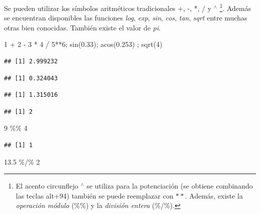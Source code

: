 \documentclass[
]{book}
\newenvironment{Shaded}{\begin{snugshade}}{\end{snugshade}}
\newcommand{\DecValTok}[1]{\textcolor[rgb]{0.00,0.00,0.81}{#1}}
\newcommand{\FloatTok}[1]{\textcolor[rgb]{0.00,0.00,0.81}{#1}}
\newcommand{\FunctionTok}[1]{\textcolor[rgb]{0.00,0.00,0.00}{#1}}
\newcommand{\NormalTok}[1]{#1}
\newcommand{\SpecialCharTok}[1]{\textcolor[rgb]{0.00,0.00,0.00}{#1}}
\begin{document}
Se pueden utilizar los símbolos aritméticos tradicionales +, -, *, / y \(^\wedge\) \footnote{El acento circunflejo \(^\wedge\) se utiliza para la potenciación (se obtiene combinando las teclas alt+94) también se puede reemplazar con \(**\). Además, existe la \emph{operación módulo} (\%\%) y la \emph{división entera} (\%/\%).}. Además se encuentran disponibles las funciones \emph{log}, \emph{exp}, \emph{sin}, \emph{cos}, \emph{tan}, \emph{sqrt} entre muchas otras bien conocidas. También existe el valor de \emph{pi}.

\begin{Shaded}
\begin{Highlighting}[]
\DecValTok{1} \SpecialCharTok{+} \DecValTok{2} \SpecialCharTok{{-}} \DecValTok{3} \SpecialCharTok{*} \DecValTok{4} \SpecialCharTok{/} \DecValTok{5}\SpecialCharTok{**}\DecValTok{6}\NormalTok{; }\FunctionTok{sin}\NormalTok{(}\FloatTok{0.33}\NormalTok{); }\FunctionTok{acos}\NormalTok{(}\FloatTok{0.253}\NormalTok{) ; }\FunctionTok{sqrt}\NormalTok{(}\DecValTok{4}\NormalTok{)}
\end{Highlighting}
\end{Shaded}

\begin{verbatim}
## [1] 2.999232
\end{verbatim}

\begin{verbatim}
## [1] 0.324043
\end{verbatim}

\begin{verbatim}
## [1] 1.315016
\end{verbatim}

\begin{verbatim}
## [1] 2
\end{verbatim}

\begin{Shaded}
\begin{Highlighting}[]
\DecValTok{9} \SpecialCharTok{\%\%} \DecValTok{4}
\end{Highlighting}
\end{Shaded}

\begin{verbatim}
## [1] 1
\end{verbatim}

\begin{Shaded}
\begin{Highlighting}[]
\FloatTok{13.5} \SpecialCharTok{\%/\%} \DecValTok{2}
\end{Highlighting}
\end{Shaded}
\end{document}
